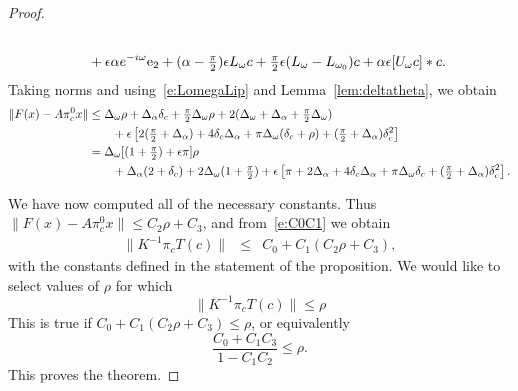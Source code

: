 \begin{proof}
\begin{alignat*}{1}
	\\ 
	&\qquad  +\epsilon  \alpha   e^{-i \omega}  \mathrm{e}_2  
+  ( \alpha- \tfrac{\pi}{2})  \epsilon L_{\omega} c + \tfrac{\pi}{2} \epsilon ( L_{\omega} - L_{\omega_0}) c + \alpha \epsilon [ U_{\omega} c ] * c .
	\end{alignat*}
Taking norms and using~\eqref{e:LomegaLip} and Lemma~\ref{lem:deltatheta}, we obtain 
	\begin{alignat*}{1}
	\| F(x) - A \pi_c^0 x\|& \leq  
	 \Delta_\omega \rho + \Delta_\alpha \delta_c + \tfrac{\pi}{2} \Delta_\omega \rho
    +	2 (\Delta_\omega + \Delta_\alpha + \tfrac{\pi}{2} \Delta_\omega)  
	   \\
	&\qquad + \epsilon \left[ 2(\tfrac{\pi}{2} + \Delta_\alpha ) + 4 \delta_c \Delta_\alpha + \pi  \Delta_\omega (  \delta_c + \rho) + (\tfrac{\pi}{2} + \Delta_\alpha ) \delta_c^2 \right]  \\
		&= \Delta_\omega [ (1+\tfrac{\pi}{2}) +   \epsilon \pi ] \rho \nonumber \\ 
	&\qquad +  \Delta_\alpha (2 + \delta_c)
	+	2 \Delta_\omega (1+\tfrac{\pi}{2}) 
	+ \epsilon \left[ \pi + 2\Delta_\alpha  + 4 \delta_c \Delta_\alpha + \pi \Delta_\omega \delta_c  + (\tfrac{\pi}{2} + \Delta_\alpha ) \delta_c^2 \right].  
	\end{alignat*}


	We have now computed all of the necessary constants. Thus $ \| F(x) - A \pi_c^0 x \| \leq C_2 \rho + C_3$, and from~\eqref{e:C0C1}   we obtain 
	\begin{eqnarray*}
	\| K^{-1} \pi_c T(c) \|
	&\leq & C_0 +  C_1 ( C_2  \rho + C_3),
	\end{eqnarray*}
with the constants defined in the statement of the proposition.
We would like to select values of $\rho$ for which 
	\[
	\| K^{-1} \pi_c T(c) \| \leq \rho
	\]
	This is true if  
	$	C_0 +  C_1 ( C_2  \rho + C_3) \leq \rho$, 
	or equivalently 
	\[
	\frac{C_0 + C_1 C_3 }{1 - C_1 C_2} \leq \rho.
	\]
	This proves the theorem.
\end{proof}



